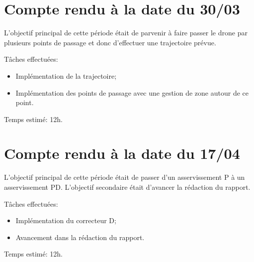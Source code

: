 	\section{Compte rendu à la date du 30/03}
		L'objectif principal de cette période était de parvenir à faire passer le drone par plusieurs points de passage et donc d'effectuer une trajectoire prévue.

		Tâches effectuées:
		\begin{itemize}
			\item Implémentation de la trajectoire;
			\item Implémentation des points de passage avec une gestion de zone autour de ce point. \\
		\end{itemize}

		Temps estimé: 12h.


	\section{Compte rendu à la date du 17/04}
		L'objectif principal de cette période était de passer d'un asservissement P à un asservissement PD. L'objectif secondaire était d'avancer la rédaction du rapport.

		Tâches effectuées:
		\begin{itemize}
			\item Implémentation du correcteur D\@;
			\item Avancement dans la rédaction du rapport. \\
		\end{itemize}

		Temps estimé: 12h.
